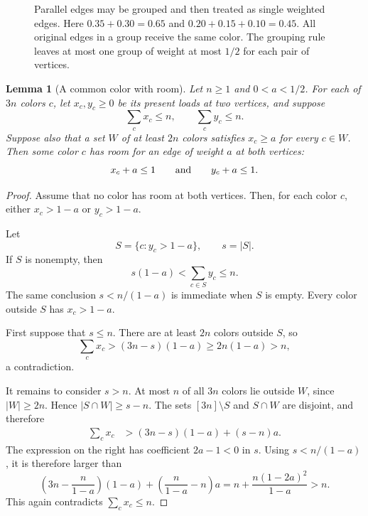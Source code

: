 \documentclass[11pt]{article}
\newtheorem{lemma}[theorem]{Lemma}
\theoremstyle{definition}\newtheorem{algorithm}{Algorithm}[section]
\numberwithin{equation}{section}
\theoremstyle{remark}\newtheorem*{remark}{Remark}
\begin{document}
\begin{figure}[htbp]
\centering
{}
\caption{Parallel edges may be grouped and then treated as single weighted
edges. Here $0.35+0.30=0.65$ and $0.20+0.15+0.10=0.45$.
All original edges in a group receive the same color. The grouping rule
leaves at most one group of weight at most $1/2$ for each pair of vertices.}
\label{fig:packets}
\end{figure}

\begin{lemma}[A common color with room]\label{lem:three-common-room}
Let $n\ge1$ and $0<a<1/2$.  For each of $3n$ colors $c$, let
$x_c,y_c\ge0$ be its present loads at two vertices, and suppose
\[
 \sum_c x_c\le n,\qquad \sum_c y_c\le n.
\]
Suppose also that a set $W$ of at least $2n$ colors satisfies
$x_c\ge a$ for every $c\in W$.  Then some color $c$ has room for an
edge of weight $a$ at both vertices:
\[
 x_c+a\le1\qquad\hbox{and}\qquad y_c+a\le1.
\]
\end{lemma}
\begin{proof}
Assume that no color has room at both vertices.  Then, for each color
$c$, either $x_c>1-a$ or $y_c>1-a$.

Let
\[
 S=\{c:y_c>1-a\},\qquad s=|S|.
\]
If $S$ is nonempty, then
\[
 s(1-a)<\sum_{c\in S}y_c\le n.
\]
The same conclusion $s<n/(1-a)$ is immediate when $S$ is empty.
Every color outside $S$ has $x_c>1-a$.

First suppose that $s\le n$.  There are at least $2n$ colors outside
$S$, so
\[
 \sum_c x_c>(3n-s)(1-a)\ge2n(1-a)>n,
\]
a contradiction.

It remains to consider $s>n$.  At most $n$ of all $3n$ colors lie
outside $W$, since $|W|\ge2n$.  Hence $|S\cap W|\ge s-n$.  The sets
$[3n]\setminus S$ and $S\cap W$ are disjoint, and therefore
\begin{align*}
 \sum_c x_c
 &>(3n-s)(1-a)+(s-n)a.                     \tag{\(*\)}
\end{align*}
The expression on the right has coefficient $2a-1<0$ in $s$.
Using $s<n/(1-a)$, it is therefore larger than
\[
 \left(3n-\frac{n}{1-a}\right)(1-a)
   +\left(\frac{n}{1-a}-n\right)a
 =n+\frac{n(1-2a)^2}{1-a}>n.
\]
This again contradicts $\sum_c x_c\le n$.
\end{proof}
\end{document}
